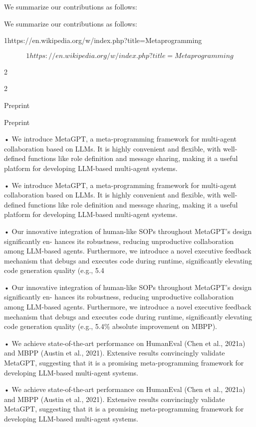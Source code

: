 \documentclass[12pt]{article}
\begin{document}
We summarize our contributions as follows:


We summarize our contributions as follows:


1https://en.wikipedia.org/w/index.php?title=Metaprogramming


\begin{equation}
1https://en.wikipedia.org/w/index.php?title=Metaprogramming
\end{equation}


2


2


Preprint


Preprint


• We introduce MetaGPT, a meta-programming framework for multi-agent collaboration based on
LLMs.
It is highly convenient and flexible, with well-defined functions like role definition and
message sharing, making it a useful platform for developing LLM-based multi-agent systems.


• We introduce MetaGPT, a meta-programming framework for multi-agent collaboration based on
LLMs.
It is highly convenient and flexible, with well-defined functions like role definition and
message sharing, making it a useful platform for developing LLM-based multi-agent systems.


• Our innovative integration of human-like SOPs throughout MetaGPT’s design significantly en-
hances its robustness, reducing unproductive collaboration among LLM-based agents. Furthermore,
we introduce a novel executive feedback mechanism that debugs and executes code during runtime,
significantly elevating code generation quality (e.g., 5.4%


• Our innovative integration of human-like SOPs throughout MetaGPT’s design significantly en-
hances its robustness, reducing unproductive collaboration among LLM-based agents. Furthermore,
we introduce a novel executive feedback mechanism that debugs and executes code during runtime,
significantly elevating code generation quality (e.g., 5.4\% absolute improvement on MBPP).


• We achieve state-of-the-art performance on HumanEval (Chen et al., 2021a) and MBPP (Austin
et al., 2021). Extensive results convincingly validate MetaGPT, suggesting that it is a promising
meta-programming framework for developing LLM-based multi-agent systems.


• We achieve state-of-the-art performance on HumanEval (Chen et al., 2021a) and MBPP (Austin
et al., 2021). Extensive results convincingly validate MetaGPT, suggesting that it is a promising
meta-programming framework for developing LLM-based multi-agent systems.
\end{document}
